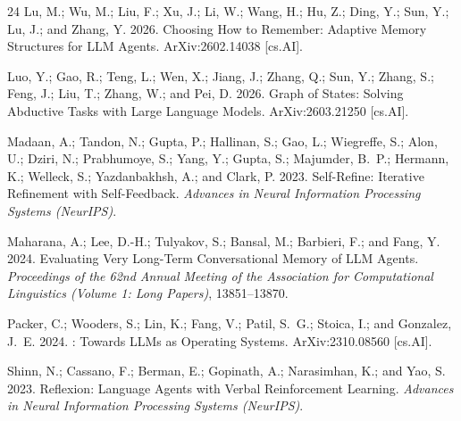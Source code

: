 \documentclass[letterpaper]{article}
\begin{document}
\begin{thebibliography}{24}
Lu, M.; Wu, M.; Liu, F.; Xu, J.; Li, W.; Wang, H.; Hu, Z.; Ding, Y.; Sun, Y.;
  Lu, J.; and Zhang, Y. 2026.
\newblock Choosing {How} to {Remember}: {Adaptive} {Memory} {Structures} for
  {LLM} {Agents}.
\newblock ArXiv:2602.14038 [cs.AI].

Luo, Y.; Gao, R.; Teng, L.; Wen, X.; Jiang, J.; Zhang, Q.; Sun, Y.; Zhang, S.;
  Feng, J.; Liu, T.; Zhang, W.; and Pei, D. 2026.
\newblock Graph of {States}: {Solving} {Abductive} {Tasks} with {Large}
  {Language} {Models}.
\newblock ArXiv:2603.21250 [cs.AI].

Madaan, A.; Tandon, N.; Gupta, P.; Hallinan, S.; Gao, L.; Wiegreffe, S.; Alon,
  U.; Dziri, N.; Prabhumoye, S.; Yang, Y.; Gupta, S.; Majumder, B.~P.; Hermann,
  K.; Welleck, S.; Yazdanbakhsh, A.; and Clark, P. 2023.
\newblock Self-{Refine}: {Iterative} {Refinement} with {Self}-{Feedback}.
\newblock \emph{Advances in Neural Information Processing Systems (NeurIPS)}.

Maharana, A.; Lee, D.-H.; Tulyakov, S.; Bansal, M.; Barbieri, F.; and Fang, Y.
  2024.
\newblock Evaluating {Very} {Long}-{Term} {Conversational} {Memory} of {LLM}
  {Agents}.
\newblock \emph{Proceedings of the 62nd Annual Meeting of the Association for
  Computational Linguistics (Volume 1: Long Papers)}, 13851--13870.

Packer, C.; Wooders, S.; Lin, K.; Fang, V.; Patil, S.~G.; Stoica, I.; and
  Gonzalez, J.~E. 2024.
: {Towards} {LLMs} as {Operating} {Systems}.
\newblock ArXiv:2310.08560 [cs.AI].

Shinn, N.; Cassano, F.; Berman, E.; Gopinath, A.; Narasimhan, K.; and Yao, S.
  2023.
\newblock Reflexion: {Language} {Agents} with {Verbal} {Reinforcement}
  {Learning}.
\newblock \emph{Advances in Neural Information Processing Systems (NeurIPS)}.


\end{thebibliography}
\end{document}
